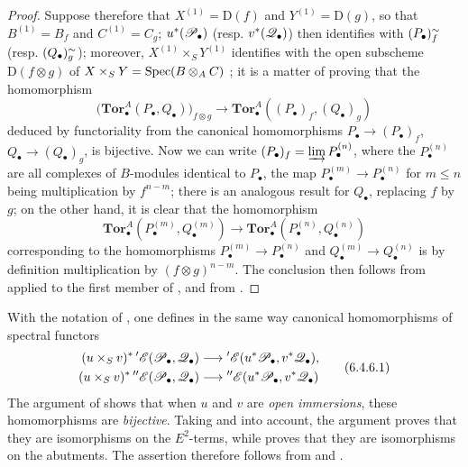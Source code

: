 \begin{proof}
Suppose therefore that $X^{(1)}=\mathrm D(f)$ and
$Y^{(1)}=\mathrm D(g)$, so that $B^{(1)}=B_f$ and
$C^{(1)}=C_g$; $u^*(\mathscr{P}_\bullet)$ (resp.
$v^*(\mathscr{Q}_\bullet)$) then identifies with
$(P_\bullet)_f^{\sim}$ (resp.
$(Q_\bullet)_g^{\sim}$); moreover,
$X^{(1)}\times_SY^{(1)}$ identifies with the open subscheme
$\mathrm D(f\otimes g)$ of $X\times_SY=\operatorname{Spec}(B\otimes_AC)$
; it is a matter of proving that the
homomorphism
\[
  \bigl(\mathbf{Tor}_\bullet^A(P_\bullet,Q_\bullet)\bigr)_{f\otimes g}
  \longrightarrow
  \mathbf{Tor}_\bullet^A((P_\bullet)_f,(Q_\bullet)_g)
  \tag{6.4.5.3}\label{III.6.4.5.3}
\]
deduced by functoriality from the canonical homomorphisms
$P_\bullet\to(P_\bullet)_f$, $Q_\bullet\to(Q_\bullet)_g$, is bijective.  Now
 we can write
$(P_\bullet)_f=\varinjlim P_\bullet^{(n)}$, where the $P_\bullet^{(n)}$ are all
complexes of $B$-modules identical to $P_\bullet$, the map
$P_\bullet^{(m)}\to P_\bullet^{(n)}$ for $m\leqslant n$ being
multiplication by $f^{n-m}$; there is an analogous result for
$Q_\bullet$, replacing $f$ by $g$; on the other hand, it is clear that the homomorphism
\[
  \mathbf{Tor}_\bullet^A(P_\bullet^{(m)},Q_\bullet^{(m)})
  \longrightarrow
  \mathbf{Tor}_\bullet^A(P_\bullet^{(n)},Q_\bullet^{(n)})
\]
corresponding to the homomorphisms
$P_\bullet^{(m)}\to P_\bullet^{(n)}$ and
$Q_\bullet^{(m)}\to Q_\bullet^{(n)}$ is by definition
multiplication by $(f\otimes g)^{n-m}$.  The conclusion then follows
from  applied to the first member of
, and from .
\end{proof}

\begin{env}[6.4.6]
\label{III.6.4.6}
With the notation of , one defines in the same way
canonical homomorphisms of spectral functors
\[
  \begin{aligned}
  (u\times_Sv)^*\,{}'\mathscr{E}(\mathscr{P}_\bullet,\mathscr{Q}_\bullet)
  &\longrightarrow
  {}'\mathscr{E}(u^*\mathscr{P}_\bullet,v^*\mathscr{Q}_\bullet),\\
  (u\times_Sv)^*\,{}''\mathscr{E}(\mathscr{P}_\bullet,\mathscr{Q}_\bullet)
  &\longrightarrow
  {}''\mathscr{E}(u^*\mathscr{P}_\bullet,v^*\mathscr{Q}_\bullet)
  \end{aligned}
  \tag{6.4.6.1}\label{III.6.4.6.1}
\]
The argument of  shows that when $u$ and $v$ are
\emph{open immersions}, these homomorphisms are \emph{bijective}.  Taking
 and  into account, the
argument proves that they are isomorphisms on the $E^2$-terms,
while  proves that they are isomorphisms on the
abutments.  The assertion therefore follows from
 and .
\end{env}



